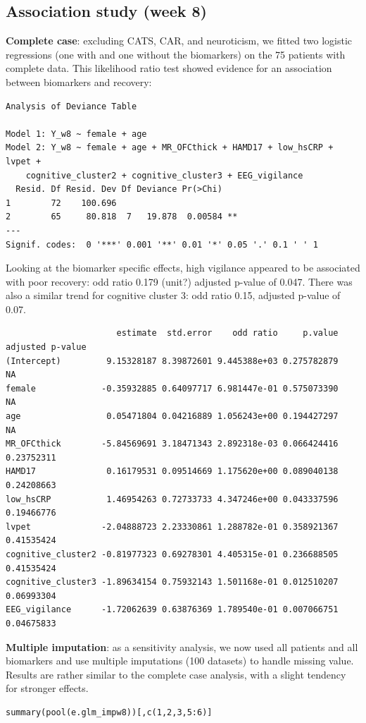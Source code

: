 \documentclass[12pt]{article}
\begin{document}
\subsection{Association study (week 8)}
\label{sec:orga1dfee0}

\textbf{Complete case}: excluding CATS, CAR, and neuroticism, we fitted two
logistic regressions (one with and one without the biomarkers) on the
75 patients with complete data. This likelihood ratio test showed
evidence for an association between biomarkers and recovery:
\begin{verbatim}
Analysis of Deviance Table

Model 1: Y_w8 ~ female + age
Model 2: Y_w8 ~ female + age + MR_OFCthick + HAMD17 + low_hsCRP + lvpet + 
    cognitive_cluster2 + cognitive_cluster3 + EEG_vigilance
  Resid. Df Resid. Dev Df Deviance Pr(>Chi)   
1        72    100.696                        
2        65     80.818  7   19.878  0.00584 **
---
Signif. codes:  0 '***' 0.001 '**' 0.01 '*' 0.05 '.' 0.1 ' ' 1
\end{verbatim}

Looking at the biomarker specific effects, high vigilance appeared to
be associated with poor recovery: odd ratio 0.179 (unit?) adjusted
p-value of 0.047. There was also a similar trend for cognitive cluster
3: odd ratio 0.15, adjusted p-value of 0.07.
\begin{verbatim}
                      estimate  std.error    odd ratio     p.value adjusted p-value
(Intercept)         9.15328187 8.39872601 9.445388e+03 0.275782879               NA
female             -0.35932885 0.64097717 6.981447e-01 0.575073390               NA
age                 0.05471804 0.04216889 1.056243e+00 0.194427297               NA
MR_OFCthick        -5.84569691 3.18471343 2.892318e-03 0.066424416       0.23752311
HAMD17              0.16179531 0.09514669 1.175620e+00 0.089040138       0.24208663
low_hsCRP           1.46954263 0.72733733 4.347246e+00 0.043337596       0.19466776
lvpet              -2.04888723 2.23330861 1.288782e-01 0.358921367       0.41535424
cognitive_cluster2 -0.81977323 0.69278301 4.405315e-01 0.236688505       0.41535424
cognitive_cluster3 -1.89634154 0.75932143 1.501168e-01 0.012510207       0.06993304
EEG_vigilance      -1.72062639 0.63876369 1.789540e-01 0.007066751       0.04675833
\end{verbatim}

\textbf{Multiple imputation}: as a sensitivity analysis, we now used all
patients and all biomarkers and use multiple imputations (100
datasets) to handle missing value. Results are rather similar to the
complete case analysis, with a slight tendency for stronger effects.
\lstset{language=r,label= ,caption= ,captionpos=b,numbers=none}
\begin{lstlisting}
summary(pool(e.glm_impw8))[,c(1,2,3,5:6)]
\end{lstlisting}
\end{document}
